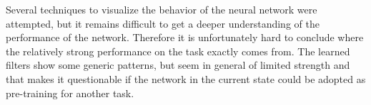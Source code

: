 Several techniques to visualize the behavior of the neural network were attempted, but it remains difficult to get a deeper understanding of the performance of the network. Therefore it is unfortunately hard to conclude where the relatively strong performance on the task exactly comes from. The learned filters show some generic patterns, but seem in general of limited strength and that makes it questionable if the network in the current state could be adopted as pre-training for another task.

